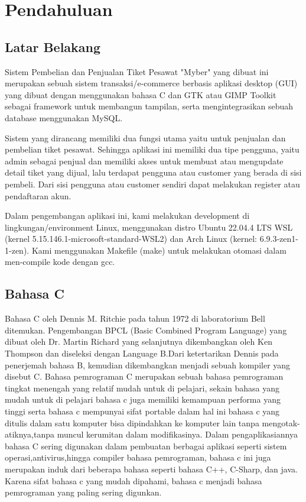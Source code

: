 \documentclass[a4paper,12pt]{article}
\begin{document}
\section{Pendahuluan}
\subsection{Latar Belakang}
Sistem Pembelian dan Penjualan Tiket Pesawat "Myber" yang dibuat ini merupakan sebuah sistem transaksi/e-commerce berbasis aplikasi desktop (GUI) yang dibuat dengan menggunakan bahasa C dan GTK atau GIMP Toolkit sebagai framework untuk membangun tampilan, serta mengintegrasikan sebuah database menggunakan MySQL.

Sistem yang dirancang memiliki dua fungsi utama yaitu untuk penjualan dan pembelian tiket pesawat. Sehingga aplikasi ini memiliki dua tipe pengguna, yaitu admin sebagai penjual dan memiliki akses untuk membuat atau mengupdate detail tiket yang dijual, lalu
terdapat pengguna atau customer yang berada di sisi pembeli. Dari sisi pengguna atau customer sendiri dapat melakukan register atau pendaftaran akun.

Dalam pengembangan aplikasi ini, kami melakukan development di lingkungan/environment Linux, menggunakan distro Ubuntu 22.04.4 LTS WSL (kernel 5.15.146.1-microsoft-standard-WSL2) dan Arch Linux (kernel: 6.9.3-zen1-1-zen). Kami menggunakan Makefile (make) untuk melakukan otomasi dalam men-compile kode dengan gcc.


\subsection{Bahasa C}
Bahasa C oleh Dennis M. Ritchie pada tahun 1972 di laboratorium Bell ditemukan. Pengembangan BPCL (Basic Combined Program Language) yang dibuat oleh Dr.
Martin Richard yang selanjutnya dikembangkan oleh Ken Thompson dan diseleksi dengan
Language B.Dari ketertarikan Dennis pada penerjemah bahasa B, kemudian dikembangkan menjadi
sebuah kompiler yang disebut C.
Bahasa pemrograman C merupakan sebuah bahasa pemrograman tingkat menengah yang relatif mudah untuk di pelajari, sekain bahasa yang mudah untuk di pelajari bahasa c juga memiliki kemampuan performa yang tinggi serta
bahasa c mempunyai sifat portable dalam hal ini bahasa c yang ditulis dalam satu komputer bisa dipindahkan ke komputer lain tanpa mengotak-atiknya,tanpa muncul kerumitan dalam modifikasinya. 
Dalam pengaplikasiannya bahasa C sering digunakan dalam pembuatan berbagai aplikasi seperti sistem operasi,antivirus,hingga compiler bahasa pemrograman, bahasa c ini juga merupakan induk dari beberapa bahasa seperti bahasa C++, C-Sharp, dan java.
Karena sifat bahasa c yang mudah dipahami, bahasa c menjadi bahasa pemrograman yang paling sering digunkan.
\end{document}
